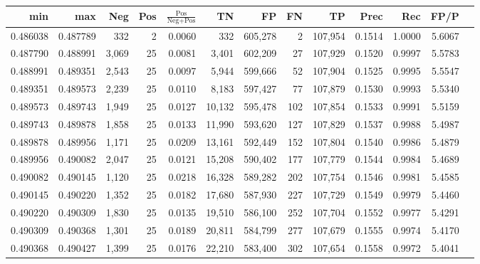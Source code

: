 \begin{tabular}{rrrrrrrrrrrrr}
\toprule
     min &      max &   Neg & Pos & $\frac{\text{Pos}}{\text{Neg}+\text{Pos}}$ &      TN &      FP &      FN &      TP &   Prec &    Rec &   FP/P \\
\midrule
0.486038 & 0.487789 &   332 &   2 &                                     0.0060 &     332 & 605,278 &       2 & 107,954 & 0.1514 & 1.0000 & 5.6067 \\
0.487790 & 0.488991 & 3,069 &  25 &                                     0.0081 &   3,401 & 602,209 &      27 & 107,929 & 0.1520 & 0.9997 & 5.5783 \\
0.488991 & 0.489351 & 2,543 &  25 &                                     0.0097 &   5,944 & 599,666 &      52 & 107,904 & 0.1525 & 0.9995 & 5.5547 \\
0.489351 & 0.489573 & 2,239 &  25 &                                     0.0110 &   8,183 & 597,427 &      77 & 107,879 & 0.1530 & 0.9993 & 5.5340 \\
0.489573 & 0.489743 & 1,949 &  25 &                                     0.0127 &  10,132 & 595,478 &     102 & 107,854 & 0.1533 & 0.9991 & 5.5159 \\
0.489743 & 0.489878 & 1,858 &  25 &                                     0.0133 &  11,990 & 593,620 &     127 & 107,829 & 0.1537 & 0.9988 & 5.4987 \\
0.489878 & 0.489956 & 1,171 &  25 &                                     0.0209 &  13,161 & 592,449 &     152 & 107,804 & 0.1540 & 0.9986 & 5.4879 \\
0.489956 & 0.490082 & 2,047 &  25 &                                     0.0121 &  15,208 & 590,402 &     177 & 107,779 & 0.1544 & 0.9984 & 5.4689 \\
0.490082 & 0.490145 & 1,120 &  25 &                                     0.0218 &  16,328 & 589,282 &     202 & 107,754 & 0.1546 & 0.9981 & 5.4585 \\
0.490145 & 0.490220 & 1,352 &  25 &                                     0.0182 &  17,680 & 587,930 &     227 & 107,729 & 0.1549 & 0.9979 & 5.4460 \\
0.490220 & 0.490309 & 1,830 &  25 &                                     0.0135 &  19,510 & 586,100 &     252 & 107,704 & 0.1552 & 0.9977 & 5.4291 \\
0.490309 & 0.490368 & 1,301 &  25 &                                     0.0189 &  20,811 & 584,799 &     277 & 107,679 & 0.1555 & 0.9974 & 5.4170 \\
0.490368 & 0.490427 & 1,399 &  25 &                                     0.0176 &  22,210 & 583,400 &     302 & 107,654 & 0.1558 & 0.9972 & 5.4041 \\

\end{tabular}

